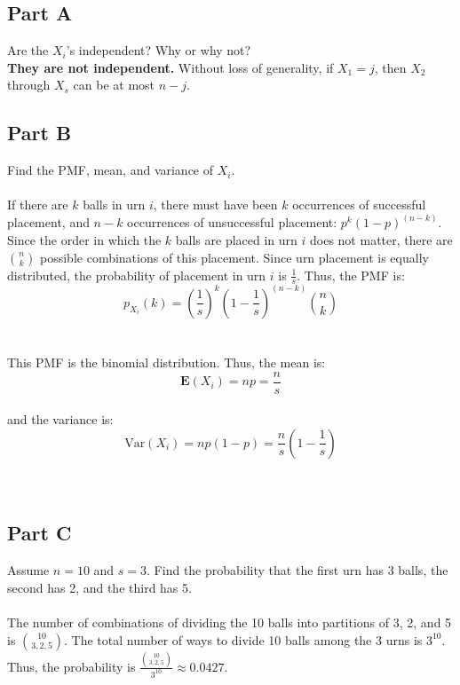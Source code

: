 \documentclass{amsart}
\begin{document}
	\subsection{Part A}
	Are the $X_i$'s independent? Why or why not?\\
	\textbf{They are not independent.}  Without loss of generality, if $X_1=j$, then $X_2$ through $X_s$ can be at most $n-j$.\\
	\subsection{Part B}
	Find the PMF, mean, and variance of $X_i$.\\
	\\
	If there are $k$ balls in urn $i$, there must have been $k$ occurrences of successful placement, and $n-k$ occurrences of unsuccessful placement: $p^k(1-p)^{(n-k)}$. Since the order in which the $k$ balls are placed in urn $i$ does not matter, there are $\binom{n}{k}$ possible combinations of this placement. Since urn placement is equally distributed, the probability of placement in urn $i$ is $\frac{1}{s}$. Thus, the PMF is:
	\[
		p_{X_{i}}(k) = \left(\frac{1}{s}\right)^k \left(1-\frac{1}{s}\right)^{(n-k)}\binom{n}{k}
	\]\\
	\\
	This PMF is the binomial distribution. Thus, the mean is:\\
	\[
		\textbf{E}(X_i) = np = \frac{n}{s}
	\]\\
	and the variance is:\\
	\[
		\text{Var}(X_i) = np(1-p) = \frac{n}{s}\left(1-\frac{1}{s}\right)
	\]\\
	\\
	\subsection{Part C}
	Assume $n=10$ and $s=3$. Find the probability that the first urn has 3 balls, the second has 2, and the third has 5.\\
	\\
	The number of combinations of dividing the 10 balls into partitions of 3, 2, and 5 is $\binom{10}{3,2,5}$. The total number of ways to divide 10 balls among the 3 urns is $3^{10}$. Thus, the probability is $\frac{\binom{10}{3,2,5}}{3^{10}} \approx 0.0427$.\\
	\\
\end{document}
